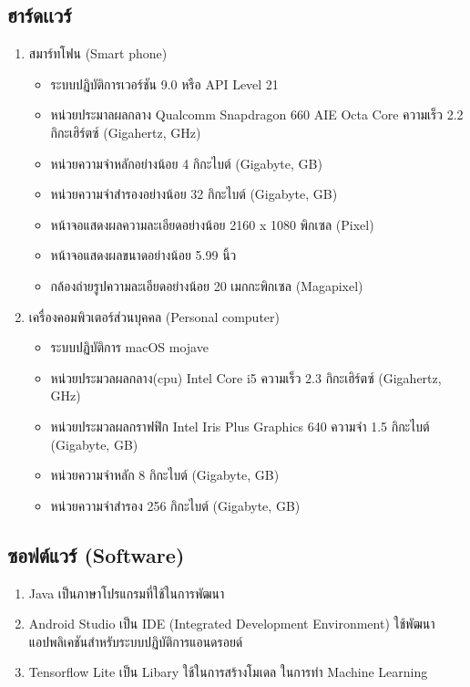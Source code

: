 \subsection{ฮาร์ดเเวร์}
\begin{enumerate}
	\item สมาร์ทโฟน (Smart phone)
		\begin{itemize}
			\item ระบบปฏิบัติการเวอร์ชัน 9.0 หรือ API Level 21
			\item หน่วยประมาลผลกลาง Qualcomm Snapdragon 660 AIE Octa Core ความเร็ว 2.2 กิกะเฮิร์ตซ์ (Gigahertz, GHz)
			\item หน่วยความจำหลักอย่างน้อย 4 กิกะไบต์ (Gigabyte, GB)
			\item หน่วยความจำสำรองอย่างน้อย 32 กิกะไบต์ (Gigabyte, GB)
			\item หน้าจอแสดงผลความละเอียดอย่างน้อย 2160 x 1080 พิกเซล  (Pixel)
			\item หน้าจอแสดงผลขนาดอย่างน้อย 5.99 นิ้ว
			\item กล้องถ่ายรูปความละเอียดอย่างน้อย 20 เมกกะพิกเซล (Magapixel)
		\end{itemize}
	
	\item เครื่องคอมพิวเตอร์ส่วนบุคคล (Personal computer)
		\begin{itemize}
			\item  	ระบบปฏิบัติการ macOS mojave 
			\item  หน่วยประมวลผลกลาง(cpu) Intel Core i5  ความเร็ว 2.3 กิกะเฮิร์ตซ์ (Gigahertz, GHz)
			\item  หน่วยประมวลผลกราฟฟิก Intel Iris Plus Graphics 640 ความจำ 1.5 กิกะไบต์ (Gigabyte, GB) 
			\item  หน่วยความจำหลัก 8 กิกะไบต์ (Gigabyte, GB)
			\item  หน่วยความจำสำรอง 256 กิกะไบต์ (Gigabyte, GB)
		\end{itemize}
\end{enumerate}

\subsection{ซอฟต์แวร์ (Software)}
\begin{enumerate}
	\item Java เป็นภาษาโปรแกรมที่ใช้ในการพัฒนา 
	\item Android Studio เป็น IDE (Integrated Development Environment) ใช้พัฒนาแอปพลิเคชันสำหรับระบบปฏิบัติการแอนดรอยด์
	\item Tensorflow Lite เป็น Libary ใช้ในการสร้างโมเดล ในการทำ Machine Learning 
\end{enumerate}

